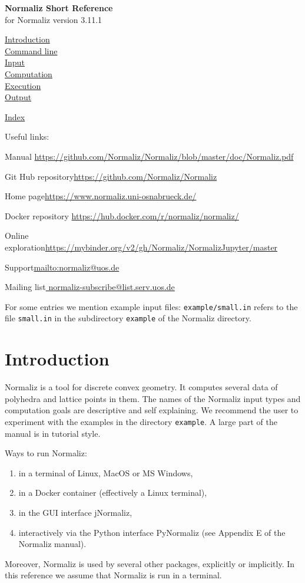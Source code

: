 \documentclass[12pt,a4paper]{scrartcl}
\theoremstyle{definition}
\def\ttt{\texttt}
\def\version{3.11.1}
\def\ContLine#1{\hyperref[#1]{\large #1}\\[6pt]}
\def\SectStart#1{\section{#1}\label{#1}\def\SectHead{#1}}
\def\example#1{\enspace\ttt{\color{blue}example/#1.in}}
\begin{document}
\vspace*{2cm}

\renewcommand{\indexname}{Index\label{Index}}


\label{Top}
\begin{center}
\Large\textbf{Normaliz Short Reference}\\[12pt] for Normaliz version \version
\end{center}

\ContLine{Introduction}
\ContLine{Command line}
\ContLine{Input}
\ContLine{Computation}
\ContLine{Execution}
\ContLine{Output}
\medskip

\ContLine{Index}

\bigskip

Useful links:\medskip

Manual \enspace \url{https://github.com/Normaliz/Normaliz/blob/master/doc/Normaliz.pdf}\smallskip

Git Hub repository\enspace \url{https://github.com/Normaliz/Normaliz}\smallskip

Home page\enspace \url{https://www.normaliz.uni-osnabrueck.de/}\smallskip

Docker repository \url{https://hub.docker.com/r/normaliz/normaliz/}\smallskip

Online exploration\enspace	\url{https://mybinder.org/v2/gh/Normaliz/NormalizJupyter/master}\smallskip

Support\enspace 	\url{mailto:normaliz@uos.de} \smallskip

Mailing list\enspace \url{ normaliz-subscribe@list.serv.uos.de}

\bigskip\bigskip

For some entries we mention example input files: \example{small} refers to the file \verb|small.in| in the subdirectory \verb|example| of the Normaliz directory.

\newpage

\SectStart{Introduction}

Normaliz is a tool for discrete convex geometry. It computes several data of polyhedra and lattice points in them. The names of the Normaliz input types and computation goals are descriptive and self explaining. We recommend the user to experiment with the examples in  the directory \verb|example|. A large part of the manual is in tutorial style.

Ways to run Normaliz:
\begin{enumerate}
\item in a terminal of Linux, MacOS or MS Windows,
\item in a Docker container (effectively a Linux terminal),
\item in the GUI interface jNormaliz,
\item interactively via the Python interface PyNormaliz (see Appendix E of the Normaliz manual).
\end{enumerate}
Moreover, Normaliz is used by several other packages, explicitly or implicitly. In this reference we assume that Normaliz is run in a terminal.
\end{document}
